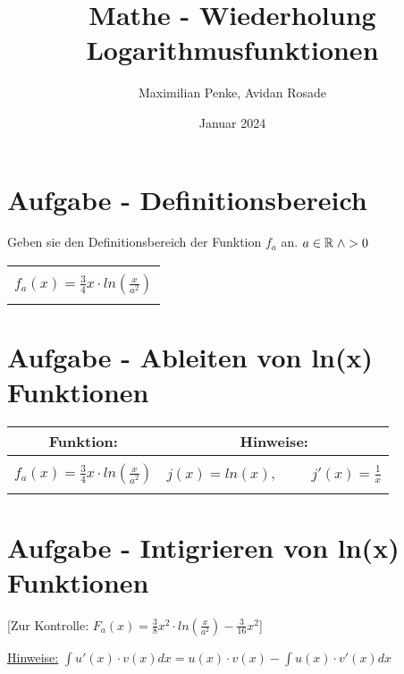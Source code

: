 \documentclass[a4paper,10pt]{article}
\title{Mathe - Wiederholung Logarithmusfunktionen}
\author{Maximilian Penke, Avidan Rosade}
\date{Januar 2024}
\begin{document}
    \maketitle

    \section{Aufgabe - Definitionsbereich}
        Geben sie den Definitionsbereich der Funktion $f_a$ an. $a \in {\mathbb{R}} \hspace{0.1cm}\wedge > 0$\\
        \begin{tabular}{|c|}
            \hline \\
                $f_a (x) = {\frac {3} {4}} x \cdot ln({\frac {x}{a^2}})$ \\ \\
            \hline
        \end{tabular}

    \section{Aufgabe - Ableiten von ln(x) Funktionen}

        \begin{tabular}{|c|c|}
            \hline
                Funktion: & Hinweise:\\
            \hline \\
                $f_a (x) = {\frac {3} {4}} x \cdot ln({\frac {x}{a^2}})$ & $j(x) = ln(x), \hspace{1cm} j'(x) = {\frac {1}{x}}$\\ \\
            \hline
        \end{tabular}



    \section{Aufgabe - Intigrieren von ln(x) Funktionen}
        \hspace{0.5cm} [Zur Kontrolle: $ F_a (x) = {\frac {3} {8}} x^2 \cdot ln({\frac {x} {a^2}}) - {\frac {3} {16} x^2}$] \\
        \def\dotfill#1{\cleaders\hbox to #1{.}\hfill}
        \newcommand\dotline[2][.5em]{\leavevmode\hbox to #2{\dotfill{#1}\hfil}}

        \underline{Hinweise:} \hspace{0.5cm}$\int u'(x) \cdot v(x) dx = u(x) \cdot v(x) - \int {u(x) \cdot v'(x)}  dx$
\end{document}
